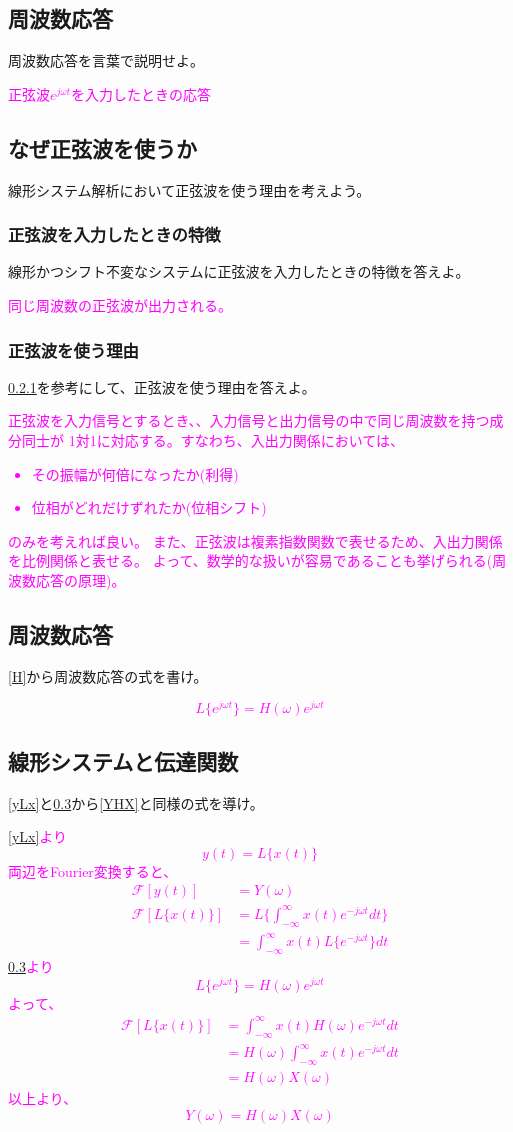 \documentclass[twocolumn]{ltjsarticle}
\newcommand{\visible}{visible}
\newcommand{\ans}[1]{
\begin{tcolorbox}[\visible]
\textcolor{magenta}{#1}
\end{tcolorbox}
}
\begin{document}
\subsection{周波数応答}
周波数応答を言葉で説明せよ。
\ans{正弦波$e^{j\omega t}$を入力したときの応答}
\subsection{なぜ正弦波を使うか}
線形システム解析において正弦波を使う理由を考えよう。
\subsubsection{正弦波を入力したときの特徴}\label{sin}
線形かつシフト不変なシステムに正弦波を入力したときの特徴を答えよ。
\ans{
    同じ周波数の正弦波が出力される。
}
\subsubsection{正弦波を使う理由}
\ref{sin}を参考にして、正弦波を使う理由を答えよ。
\ans{
    正弦波を入力信号とするとき、、入力信号と出力信号の中で同じ周波数を持つ成分同士が
    1対1に対応する。すなわち、入出力関係においては、
    \begin{itemize}
        \item その振幅が何倍になったか(利得)
        \item 位相がどれだけずれたか(位相シフト)
    \end{itemize}
    のみを考えれば良い。
    また、正弦波は複素指数関数で表せるため、入出力関係を比例関係と表せる。
    よって、数学的な扱いが容易であることも挙げられる(周波数応答の原理)。
}
\subsection{周波数応答}\label{He}
\ref{H}から周波数応答の式を書け。
\ans{
    $$L\{e^{j\omega t}\}=H(\omega)e^{j\omega t}$$
}
\subsection{線形システムと伝達関数}
\ref{yLx}と\ref{He}から\ref{YHX}と同様の式を導け。
\ans{
    \ref{yLx}より$$y(t)=L\{x(t)\}$$
    両辺をFourier変換すると、
    \begin{align*}
        \mathcal{F}[y(t)]&=Y(\omega)\\
        \mathcal{F}[L\{x(t)\}]&=L\{\int_{-\infty}^{\infty}x(t)e^{-j\omega t}dt\}\\
        &=\int_{-\infty}^{\infty}x(t)L\{e^{-j\omega t}\}dt
    \end{align*}
    \ref{He}より$$L\{e^{j\omega t}\}=H(\omega)e^{j\omega t}$$
    よって、
    \begin{align*}
        \mathcal{F}[L\{x(t)\}]&=\int_{-\infty}^{\infty}x(t)H(\omega)e^{-j\omega t}dt\\
        &=H(\omega)\int_{-\infty}^{\infty}x(t)e^{-j\omega t}dt\\
        &=H(\omega)X(\omega)
    \end{align*}
    以上より、
    $$Y(\omega)=H(\omega)X(\omega)$$
}
\end{document}
